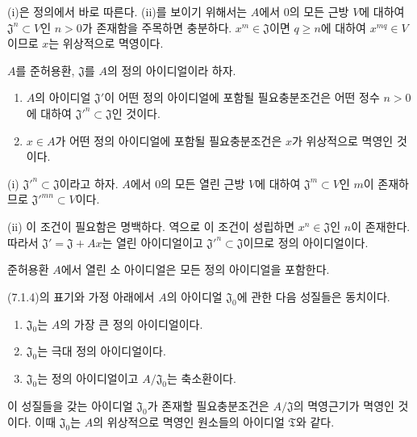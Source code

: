 (i)은 정의에서 바로 따른다. (ii)를 보이기 위해서는 $A$에서 $0$의
모든 근방 $V$에 대하여 $\mathfrak J^n\subset V$인 $n>0$가 존재함을
주목하면 충분하다. $x^m\in\mathfrak J$이면 $q\geq n$에 대하여
$x^{mq}\in V$이므로 $x$는 위상적으로 멱영이다.

\begin{proposition}[7.1.4]
\label{0.7.1.4-ko}
$A$를 준허용환, $\mathfrak J$를 $A$의 정의 아이디얼이라 하자.
\begin{enumerate}
  \item[{\upshape(i)}] $A$의 아이디얼 $\mathfrak J'$이 어떤 정의
    아이디얼에 포함될 필요충분조건은 어떤 정수 $n>0$에 대하여
    ${\mathfrak J'}^n\subset\mathfrak J$인 것이다.
  \item[{\upshape(ii)}] $x\in A$가 어떤 정의 아이디얼에 포함될
    필요충분조건은 $x$가 위상적으로 멱영인 것이다.
\end{enumerate}
\end{proposition}

(i) ${\mathfrak J'}^n\subset\mathfrak J$이라고 하자. $A$에서 $0$의
모든 열린 근방 $V$에 대하여 $\mathfrak J^m\subset V$인 $m$이
존재하므로 ${\mathfrak J'}^{mn}\subset V$이다.

(ii) 이 조건이 필요함은 명백하다. 역으로 이 조건이 성립하면
$x^n\in\mathfrak J$인 $n$이 존재한다. 따라서
$\mathfrak J'=\mathfrak J+Ax$는 열린 아이디얼이고
${\mathfrak J'}^n\subset\mathfrak J$이므로 정의 아이디얼이다.

\begin{corollary}[7.1.5]
\label{0.7.1.5-ko}
준허용환 $A$에서 열린 소 아이디얼은 모든 정의 아이디얼을 포함한다.
\end{corollary}

\begin{corollary}[7.1.6]
\label{0.7.1.6-ko}
(7.1.4)의 표기와 가정 아래에서 $A$의 아이디얼 $\mathfrak J_0$에
관한 다음 성질들은 동치이다.
\begin{enumerate}
  \item[$a)$] $\mathfrak J_0$는 $A$의 가장 큰 정의 아이디얼이다.
  \item[$b)$] $\mathfrak J_0$는 극대 정의 아이디얼이다.
  \item[$c)$] $\mathfrak J_0$는 정의 아이디얼이고
    $A/\mathfrak J_0$는 축소환이다.
\end{enumerate}
이 성질들을 갖는 아이디얼 $\mathfrak J_0$가 존재할 필요충분조건은
$A/\mathfrak J$의 멱영근기가 멱영인 것이다. 이때
$\mathfrak J_0$는 $A$의 위상적으로 멱영인 원소들의 아이디얼
$\mathfrak T$와 같다.
\end{corollary}

